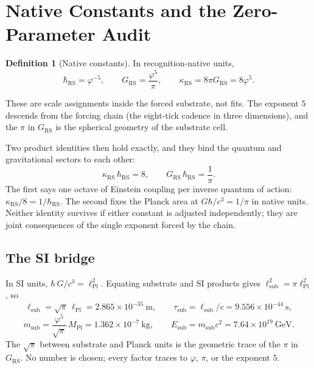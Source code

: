 \documentclass[11pt,letterpaper]{article}
\theoremstyle{definition}
\newtheorem{definition}[theorem]{Definition}
\newcommand{\phiG}{\varphi}
\newcommand{\RS}{\mathrm{RS}}
\newcommand{\Pl}{\mathrm{Pl}}
\newcommand{\bsub}{\mathrm{sub}}
\begin{document}
\section{Native Constants and the Zero-Parameter Audit}
\label{sec:constants}

\begin{definition}[Native constants]
In recognition-native units,
\begin{equation}\label{eq:native}
\hbar_\RS=\phiG^{-5},\qquad
G_\RS=\frac{\phiG^{5}}{\pi},\qquad
\kappa_\RS = 8\pi G_\RS = 8\phiG^{5}.
\end{equation}
\end{definition}

These are scale assignments inside the forced substrate, not fits.
The exponent $5$ descends from the forcing chain (the eight-tick
cadence in three dimensions), and the $\pi$ in $G_\RS$ is the spherical
geometry of the substrate cell.

Two product identities then hold exactly, and they bind the quantum
and gravitational sectors to each other:
\begin{equation}\label{eq:octave}
\kappa_\RS\,\hbar_\RS = 8,
\qquad
G_\RS\,\hbar_\RS=\frac{1}{\pi}.
\end{equation}
The first says one octave of Einstein coupling per inverse quantum of
action: $\kappa_\RS/8=1/\hbar_\RS$.  The second fixes the Planck area
at $G\hbar/c^3=1/\pi$ in native units.  Neither identity survives if
either constant is adjusted independently; they are joint consequences
of the single exponent forced by the chain.

\subsection{The SI bridge}

In SI units, $\hbar\,G/c^3=\ell_\Pl^2$.  Equating substrate and SI
products gives $\ell_\bsub^2=\pi\ell_\Pl^2$, so
\begin{equation}\label{eq:lsub}
\ell_\bsub=\sqrt{\pi}\,\ell_\Pl=2.865\times10^{-35}\ \text{m},
\qquad
\tau_\bsub=\ell_\bsub/c=9.556\times10^{-44}\ \text{s},
\end{equation}
\begin{equation}
m_\bsub=\frac{\phiG^{5}}{\sqrt{\pi}}\,M_\Pl
=1.362\times10^{-7}\ \text{kg},
\qquad
E_\bsub=m_\bsub c^2=7.64\times10^{19}\ \text{GeV}.
\end{equation}
The $\sqrt{\pi}$ between substrate and Planck units is the geometric
trace of the $\pi$ in $G_\RS$.  No number is chosen; every factor
traces to $\phiG$, $\pi$, or the exponent $5$.
\end{document}
